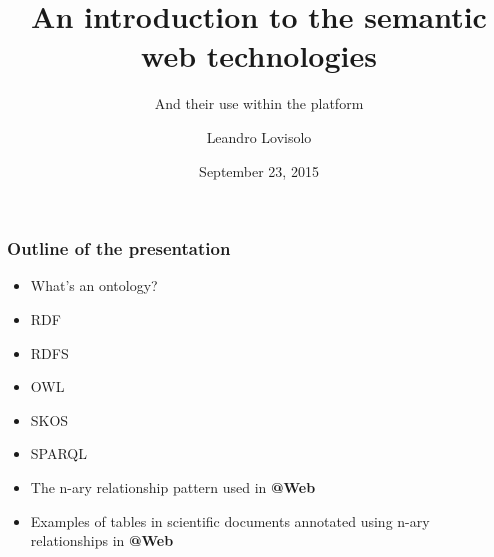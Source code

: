 \documentclass{beamer}
\title{An introduction to the semantic web technologies}
\subtitle{
  And their use within the \atweb platform
}
\author{
  Leandro Lovisolo
}
\date{September 23, 2015}
\institute{
  INRA SupAgro and INRIA GraphiK \\
  Montpellier, France
}
\makeatletter
\newcommand{\atweb}{\textbf{@Web}\xspace}
\makeatother
\begin{document}
\begin{frame}
  \titlepage
\end{frame}

\begin{frame}
  \frametitle{Outline of the presentation}

  \begin{itemize}
    \item What's an ontology?
    \item RDF
    \item RDFS
    \item OWL
    \item SKOS
    \item SPARQL
    \item The n-ary relationship pattern used in \atweb
    \item Examples of tables in scientific documents annotated using n-ary
      relationships in \atweb
  \end{itemize}
\end{frame}
\end{document}
